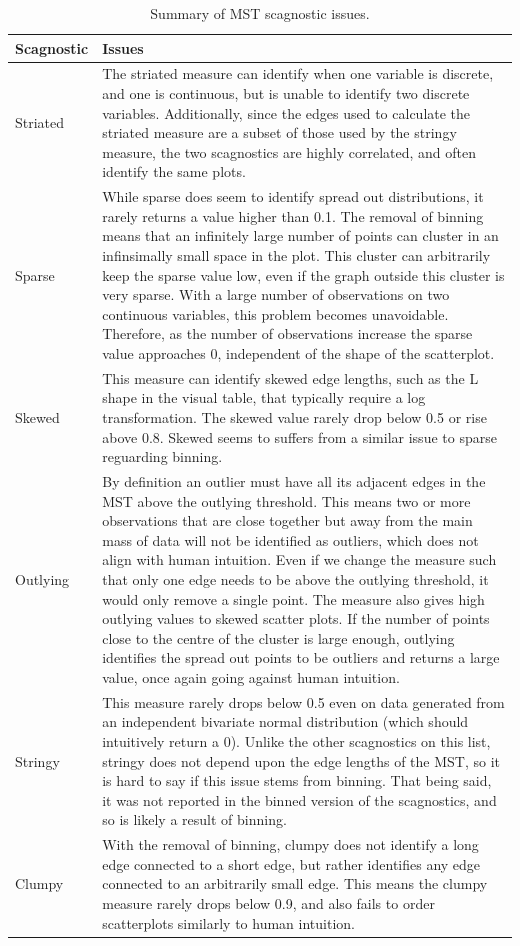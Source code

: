 \begin{table}

\caption{\label{tab:scagissues-tb-pdf}Summary of MST scagnostic issues.}
\centering
\begin{tabular}[t]{l>{\raggedright\arraybackslash}p{12cm}}
\toprule
Scagnostic & Issues\\
\midrule
Striated & The striated measure can identify when one variable is discrete, and one is continuous, but is unable to identify two discrete variables. Additionally, since the edges used to calculate the striated measure are a subset of those used by the stringy measure, the two scagnostics are highly correlated, and often identify the same plots.\\
Sparse & While sparse does seem to identify spread out distributions, it rarely returns a value higher than 0.1. The removal of binning means that an infinitely large number of points can cluster in an infinsimally small space in the plot. This cluster can arbitrarily keep the sparse value low, even if the graph outside this cluster is very sparse. With a large number of observations on two continuous variables, this problem becomes unavoidable. Therefore, as the number of observations increase the sparse value approaches 0, independent of the shape of the scatterplot.\\
Skewed & This measure can identify skewed edge lengths, such as the L shape in the visual table, that typically require a log transformation. The skewed value rarely drop below 0.5 or rise above 0.8. Skewed seems to suffers from a similar issue to sparse reguarding binning.\\
Outlying & By definition an outlier must have all its adjacent edges in the MST above the outlying threshold. This means two or more observations that are close together but away from the main mass of data will not be identified as outliers, which does not align with human intuition. Even if we change the measure such that only one edge needs to be above the outlying threshold, it would only remove a single point. The measure also gives high outlying values to skewed scatter plots.  If the number of points close to the centre of the cluster is large enough, outlying identifies the spread out points to be outliers and returns a large value, once again going against human intuition.\\
Stringy & This measure rarely drops below 0.5 even on data generated from an independent bivariate normal distribution (which should intuitively return a 0). Unlike the other scagnostics on this list, stringy does not depend upon the edge lengths of the MST, so it is hard to say if this issue stems from binning. That being said, it was not reported in the binned version of the scagnostics, and so is likely a result of binning.\\
\addlinespace
Clumpy & With the removal of binning, clumpy does not identify a long edge connected to a short edge, but rather identifies any edge connected to an arbitrarily small edge. This means the clumpy measure rarely drops below 0.9, and also fails to order scatterplots similarly to human intuition.\\
\bottomrule
\end{tabular}
\end{table}

